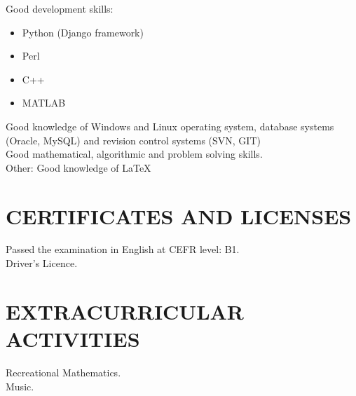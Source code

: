 \documentclass{res}
\begin{document}
\begin{resume}
	Good development skills:
	\begin{itemize}
		\item Python (Django framework)
		\item Perl
		\item C++
		\item MATLAB
	\end{itemize}
	Good knowledge of Windows and Linux operating system, database systems (Oracle, MySQL) and revision control systems (SVN, GIT)\\
	Good mathematical, algorithmic and problem solving skills.\\
	Other: Good knowledge of \LaTeX \\
 

\section{CERTIFICATES AND LICENSES}
	Passed the examination in English at CEFR level: B1. \\
	Driver's Licence. \\

\section{EXTRACURRICULAR ACTIVITIES}          
	Recreational Mathematics. \\
	Music. \\
 
\end{resume}
\end{document}
